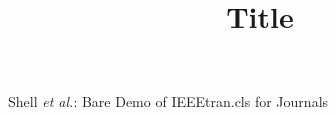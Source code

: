\documentclass[journal]{IEEEtran}
\begin{document}
\title{Title}
%
%
%

\author{ }


% 
%



%
{Shell \MakeLowercase{\textit{et al.}}: Bare Demo of IEEEtran.cls for Journals}




\maketitle

\begin{abstract}

\end{abstract}
\end{document}
